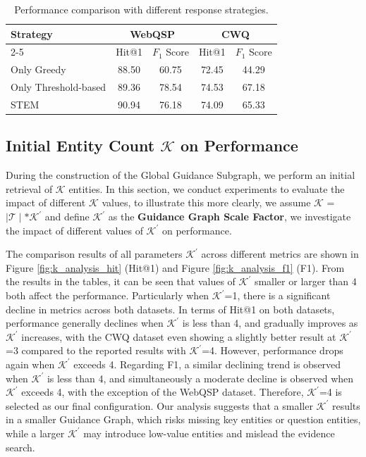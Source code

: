 \documentclass[11pt]{article}
\begin{document}
\begin{table}[t]
\centering
\footnotesize
\renewcommand{\arraystretch}{1.15}
\setlength{\tabcolsep}{2.5pt} 

\begin{tabular}{l|cc|cc}
\toprule
\hline
\multirow{2}{*}{\textbf{Strategy}} & 
\multicolumn{2}{c|}{\textbf{WebQSP}} & 
\multicolumn{2}{c}{\textbf{CWQ}} \\ \cline{2-5} 

& Hit@1 & $F_1$ Score & Hit@1 & $F_1$ Score \\ 

\hline
Only Greedy & 88.50 & 60.75 & 72.45 & 44.29 \\
Only Threshold-based & 89.36 & 78.54 & 74.53 & 67.18 \\ 
STEM  & 90.94 & 76.18 & 74.09 & 65.33 \\
\hline
\bottomrule
\end{tabular}
\caption{Performance comparison with different response strategies.}
\label{tab:resp_stra}
\end{table}

\subsection{Initial Entity Count $\mathcal{K}$ on Performance}
During the construction of the Global Guidance Subgraph, we perform an initial retrieval of $\mathcal{K}$
entities. In this section, we conduct experiments to evaluate the impact of different $\mathcal{K}$ values, to illustrate this more clearly, we assume $\mathcal{K}$ = $\mid\mathcal{T}\mid*\mathcal{K^{'}}$ and define $\mathcal{K}^{'}$ as the \textbf{Guidance Graph Scale Factor}, we investigate the impact of different values of $\mathcal{K}^{'}$ on performance.

The comparison results of all parameters $\mathcal{K^{'}}$ across different metrics are shown in Figure \ref{fig:k_analysis_hit} (Hit@1) and Figure \ref{fig:k_analysis_f1} (F1). From the results in the tables, it can be seen that values of $\mathcal{K}^{'}$ smaller or larger than 4 both affect the performance. Particularly when $\mathcal{K}^{'}$=1, there is a significant decline in metrics across both datasets. In terms of Hit@1 on both datasets, performance generally declines when $\mathcal{K^{'}}$ is less than 4, and gradually improves as $\mathcal{K^{'}}$ increases, with the CWQ dataset even showing a slightly better result at $\mathcal{K^{'}}$=3 compared to the reported results with $\mathcal{K^{'}}$=4. However, performance drops again when $\mathcal{K^{'}}$ exceeds 4. Regarding F1, a similar declining trend is observed when $\mathcal{K^{'}}$ is less than 4, and simultaneously a moderate decline is observed when $\mathcal{K}^{'}$ exceeds 4, with the exception of the WebQSP dataset. Therefore, $\mathcal{K}^{'}$=4 is selected as our final configuration. Our analysis suggests that a smaller $\mathcal{K^{'}}$ results in a smaller Guidance Graph, which risks missing key entities or question entities, while a larger $\mathcal{K^{'}}$ may introduce low-value entities and mislead the evidence search.  
\end{document}
